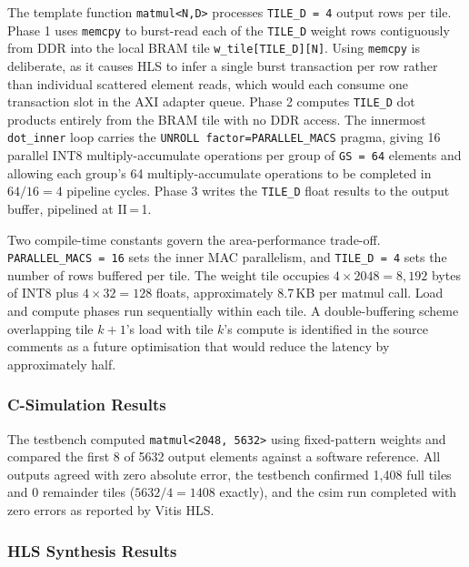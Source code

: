 The template function \texttt{matmul<N,D>} processes \texttt{TILE\_D\,=\,4}
output rows per tile. Phase 1 uses \texttt{memcpy} to burst-read each of
the \texttt{TILE\_D} weight rows contiguously from DDR into the local BRAM
tile \texttt{w\_tile[TILE\_D][N]}. Using \texttt{memcpy} is deliberate, as it
causes HLS to infer a single burst transaction per row rather than
individual scattered element reads, which would each consume one
transaction slot in the AXI adapter queue. Phase 2 computes \texttt{TILE\_D}
dot products entirely from the BRAM tile with no DDR access. The innermost
\texttt{dot\_inner} loop carries the \texttt{UNROLL factor=PARALLEL\_MACS}
pragma, giving 16 parallel INT8 multiply-accumulate operations per group of
\texttt{GS\,=\,64} elements and allowing each group's 64 multiply-accumulate
operations to be completed in $64/16 = 4$ pipeline cycles. Phase 3 writes
the \texttt{TILE\_D} float results to the output buffer, pipelined at
II\,=\,1.

Two compile-time constants govern the area-performance trade-off.
\texttt{PARALLEL\_MACS\,=\,16} sets the inner MAC parallelism, and
\texttt{TILE\_D\,=\,4} sets the number of rows buffered per tile. The
weight tile occupies $4 \times 2048 = 8{,}192$ bytes of INT8 plus
$4 \times 32 = 128$ floats, approximately 8.7\,KB per matmul call.
Load and compute phases run sequentially within each tile. A
double-buffering scheme overlapping tile $k+1$'s load with tile $k$'s
compute is identified in the source comments as a future optimisation
that would reduce the latency by approximately half.

\subsubsection{C-Simulation Results}
\label{subsubsec:matmul_update3_csim}

The testbench computed \texttt{matmul<2048,\,5632>} using fixed-pattern
weights and compared the first 8 of 5632 output elements against a software
reference. All outputs agreed with zero absolute error, the testbench
confirmed 1{,}408 full tiles and 0 remainder tiles ($5632/4 = 1408$
exactly), and the csim run completed with zero errors as reported by
Vitis HLS.

\subsubsection{HLS Synthesis Results}
\label{subsubsec:matmul_update3_csyn}


